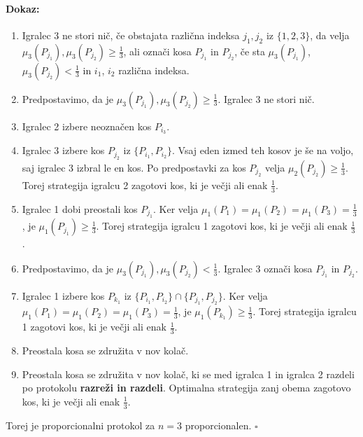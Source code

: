\documentclass[a4paper, 12pt]{article}
\newenvironment{dokaz}{\paragraph{Dokaz:}}{\hfill$\square$\\}
\begin{document}
\begin{dokaz}
\begin{enumerate}
			\item \qquad Igralec 3 ne stori nič, če obstajata različna indeksa $j_1, j_2$ iz $\{1, 2, 3\}$, da velja $\mu_3 (P_{j_1}), \mu_3 (P_{j_2}) \geq \frac{1}{3}$, ali označi kosa $P_{j_1}$ in $P_{j_2}$, če sta $\mu_3 (P_{j_1})$, $\mu_3 (P_{j_2}) < \frac{1}{3}$ in $i_1$, $i_2$ različna indeksa.
			
			\item[] \qquad Predpostavimo, da je $\mu_3 (P_{j_1}), \mu_3 (P_{j_2}) \geq \frac{1}{3}$. Igralec 3 ne stori nič.
			
			\setcounter{enumi}{3}
			
			\item \qquad \qquad Igralec 2 izbere neoznačen kos $P_{i_3}$.
			
			\item \qquad \qquad Igralec 3 izbere kos $P_{j_2}$ iz $\{P_{i_1}, P_{i_2}\}$. Vsaj eden izmed teh kosov je še na voljo, saj igralec 3 izbral le en kos. Po predpostavki za kos $P_{j_2}$ velja $\mu_2 (P_{j_2}) \geq \frac{1}{3}$. Torej strategija igralcu 2 zagotovi kos, ki je večji ali enak $\frac{1}{3}$.
			
			\item \qquad \qquad Igralec 1 dobi preostali kos $P_{j_1}$. Ker velja $\mu_1 (P_1) = \mu_1 (P_2) = \mu_1 (P_3) = \frac{1}{3}$, je $\mu_1 (P_{j_1}) \geq \frac{1}{3}$. Torej strategija igralcu 1 zagotovi kos, ki je večji ali enak $\frac{1}{3}$.
			
			\item[] \qquad Predpostavimo, da je $\mu_3 (P_{j_1}), \mu_3 (P_{j_2}) < \frac{1}{3}$. Igralec 3 označi kosa $P_{j_1}$ in $P_{j_2}$.
			
			\setcounter{enumi}{3}
			
			\item \qquad \qquad Igralec 1 izbere kos $P_{k_1}$ iz $\{P_{i_1}, P_{i_2}\} \cap \{P_{j_1}, P_{j_2}\}$. Ker velja $\mu_1 (P_1) = \mu_1 (P_2) = \mu_1 (P_3) = \frac{1}{3}$, je $\mu_1 (P_{k_1}) \geq \frac{1}{3}$. Torej strategija igralcu 1 zagotovi kos, ki je večji ali enak $\frac{1}{3}$.
			
			\item \qquad \qquad Preostala kosa se združita v nov kolač.
			
			\item \qquad \qquad Preostala kosa se združita v nov kolač, ki se med igralca 1 in igralca 2 razdeli po protokolu \textbf{razreži in razdeli}. Optimalna strategija zanj obema zagotovo kos, ki je večji ali enak $\frac{1}{3}$.
			
		\end{enumerate}
		Torej je proporcionalni protokol za $n = 3$ proporcionalen.
	\end{dokaz}
\end{document}
